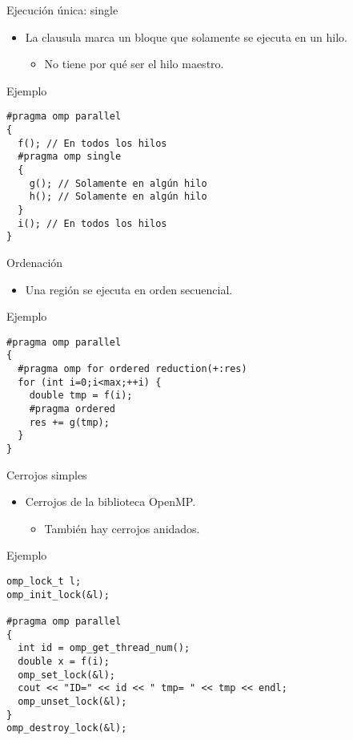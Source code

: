 \begin{frame}[t,fragile]{Ejecución única: single}
\begin{itemize}
  \item La clausula  marca un bloque que solamente se ejecuta
        en un hilo.
    \begin{itemize}
      \item No tiene por qué ser el hilo maestro.
    \end{itemize}
\end{itemize}
\begin{block}{Ejemplo}
\begin{lstlisting}
#pragma omp parallel
{
  f(); // En todos los hilos
  #pragma omp single
  {
    g(); // Solamente en algún hilo 
    h(); // Solamente en algún hilo
  }
  i(); // En todos los hilos
}
\end{lstlisting}
\end{block}
\end{frame}

\begin{frame}[t,fragile]{Ordenación}
\begin{itemize}
  \item Una región  se ejecuta en orden secuencial.
\end{itemize}
\begin{block}{Ejemplo}
\begin{lstlisting}
#pragma omp parallel
{
  #pragma omp for ordered reduction(+:res)
  for (int i=0;i<max;++i) {
    double tmp = f(i);
    #pragma ordered
    res += g(tmp);
  }
}
\end{lstlisting}
\end{block}

\end{frame}

\begin{frame}[t,fragile]{Cerrojos simples}
\begin{itemize}
  \item Cerrojos de la biblioteca OpenMP.
    \begin{itemize}
      \item También hay cerrojos anidados.
    \end{itemize}
\end{itemize}
\begin{block}{Ejemplo}
\begin{lstlisting}
omp_lock_t l;
omp_init_lock(&l);

#pragma omp parallel
{
  int id = omp_get_thread_num();
  double x = f(i);
  omp_set_lock(&l);
  cout << "ID=" << id << " tmp= " << tmp << endl;
  omp_unset_lock(&l);
}
omp_destroy_lock(&l);
\end{lstlisting}
\end{block}
\end{frame}

